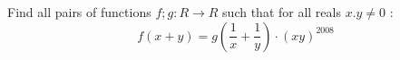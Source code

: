 Find all pairs of functions $f; g : R \to R$ such that for all reals $x.y \ne 0$ :
$$f(x + y) = g \left(\frac{1}{x}+\frac{1}{y}\right) \cdot (xy)^{2008}$$